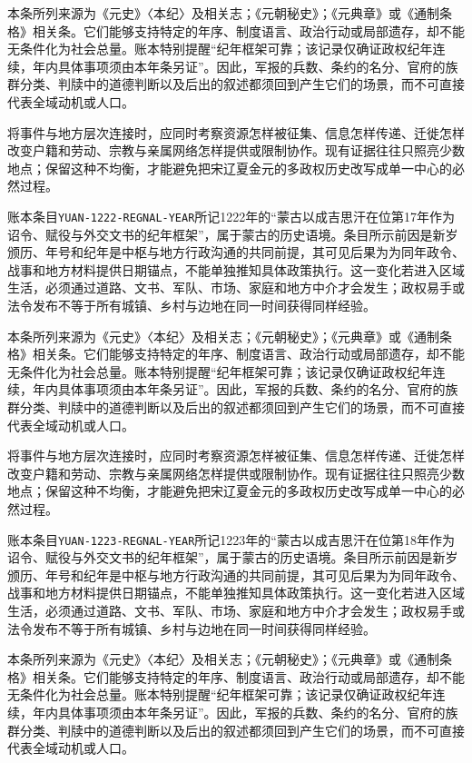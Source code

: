 本条所列来源为《元史》〈本纪〉及相关志；《元朝秘史》；《元典章》或《通制条格》相关条。它们能够支持特定的年序、制度语言、政治行动或局部遗存，却不能无条件化为社会总量。账本特别提醒“纪年框架可靠；该记录仅确证政权纪年连续，年内具体事项须由本年条另证”。因此，军报的兵数、条约的名分、官府的族群分类、判牍中的道德判断以及后出的叙述都须回到产生它们的场景，而不可直接代表全域动机或人口。

将事件与地方层次连接时，应同时考察资源怎样被征集、信息怎样传递、迁徙怎样改变户籍和劳动、宗教与亲属网络怎样提供或限制协作。现有证据往往只照亮少数地点；保留这种不均衡，才能避免把宋辽夏金元的多政权历史改写成单一中心的必然过程。

账本条目\texttt{YUAN-1222-REGNAL-YEAR}所记1222年的“蒙古以成吉思汗在位第17年作为诏令、赋役与外交文书的纪年框架”，属于蒙古的历史语境。条目所示前因是新岁颁历、年号和纪年是中枢与地方行政沟通的共同前提，其可见后果为为同年政令、战事和地方材料提供日期锚点，不能单独推知具体政策执行。这一变化若进入区域生活，必须通过道路、文书、军队、市场、家庭和地方中介才会发生；政权易手或法令发布不等于所有城镇、乡村与边地在同一时间获得同样经验。

本条所列来源为《元史》〈本纪〉及相关志；《元朝秘史》；《元典章》或《通制条格》相关条。它们能够支持特定的年序、制度语言、政治行动或局部遗存，却不能无条件化为社会总量。账本特别提醒“纪年框架可靠；该记录仅确证政权纪年连续，年内具体事项须由本年条另证”。因此，军报的兵数、条约的名分、官府的族群分类、判牍中的道德判断以及后出的叙述都须回到产生它们的场景，而不可直接代表全域动机或人口。

将事件与地方层次连接时，应同时考察资源怎样被征集、信息怎样传递、迁徙怎样改变户籍和劳动、宗教与亲属网络怎样提供或限制协作。现有证据往往只照亮少数地点；保留这种不均衡，才能避免把宋辽夏金元的多政权历史改写成单一中心的必然过程。

账本条目\texttt{YUAN-1223-REGNAL-YEAR}所记1223年的“蒙古以成吉思汗在位第18年作为诏令、赋役与外交文书的纪年框架”，属于蒙古的历史语境。条目所示前因是新岁颁历、年号和纪年是中枢与地方行政沟通的共同前提，其可见后果为为同年政令、战事和地方材料提供日期锚点，不能单独推知具体政策执行。这一变化若进入区域生活，必须通过道路、文书、军队、市场、家庭和地方中介才会发生；政权易手或法令发布不等于所有城镇、乡村与边地在同一时间获得同样经验。

本条所列来源为《元史》〈本纪〉及相关志；《元朝秘史》；《元典章》或《通制条格》相关条。它们能够支持特定的年序、制度语言、政治行动或局部遗存，却不能无条件化为社会总量。账本特别提醒“纪年框架可靠；该记录仅确证政权纪年连续，年内具体事项须由本年条另证”。因此，军报的兵数、条约的名分、官府的族群分类、判牍中的道德判断以及后出的叙述都须回到产生它们的场景，而不可直接代表全域动机或人口。

